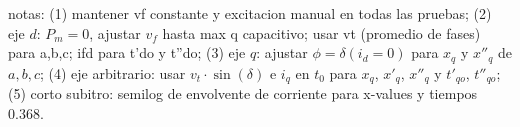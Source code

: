 \documentclass[10pt]{article}
\begin{document}
{%
}%

\vspace{0.5ex}
\begin{minipage}{0.98\linewidth}\footnotesize
notas:
(1) mantener vf constante y excitacion manual en todas las pruebas;
(2) eje $d$: $P_m=0$, ajustar $v_f$ hasta max q capacitivo; usar vt (promedio de fases) para a,b,c; ifd para t'do y t''do;
(3) eje $q$: ajustar $\phi = \delta (i_d=0)$ para $x_q$ y $x''_q$ de $a,b,c$;
(4) eje arbitrario: usar $v_t\cdot \sin(\delta)$ e $i_q$ en $t_0$ para $x_q$, $x'_q$, $x''_q$ y $t'_{qo}$, $t''_{qo}$;
(5) corto subitro: semilog de envolvente de corriente para x-values y tiempos 0.368.
\end{minipage}
\end{document}
